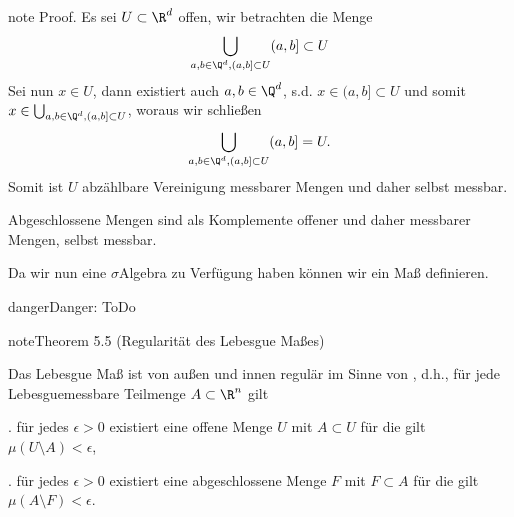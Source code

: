 \documentclass[letterpaper,10pt,english]{jupyterBook}
\begin{document}
\begin{sphinxadmonition}{note}
\sphinxAtStartPar
Proof. Es sei \(U\subset\R^d\) offen, wir betrachten die Menge
\begin{equation*}
\begin{split}\bigcup_{a,b\in \Q^d, (a,b]\subset U} (a,b]\subset U\end{split}
\end{equation*}
\sphinxAtStartPar
Sei nun \(x\in U\), dann existiert auch \(a,b\in\Q^d\), s.d. \(x\in(a,b]\subset U\) und somit \(x\in\bigcup_{a,b\in \Q^d, (a,b]\subset U}\), woraus wir schließen
\begin{equation*}
\begin{split}\bigcup_{a,b\in \Q^d, (a,b]\subset U} (a,b] = U.\end{split}
\end{equation*}
\sphinxAtStartPar
Somit ist \(U\) abzählbare Vereinigung messbarer Mengen und daher selbst messbar.

\sphinxAtStartPar
Abgeschlossene Mengen sind als Komplemente offener und daher messbarer Mengen, selbst messbar.
\end{sphinxadmonition}

\sphinxAtStartPar
Da wir nun eine \(\sigma\)\sphinxhyphen{}Algebra zu Verfügung haben können wir ein Maß definieren.

\begin{sphinxadmonition}{danger}{Danger:}
\sphinxAtStartPar
ToDo
\end{sphinxadmonition}
\label{masstheorie/masstheorie:theorem-37}
\begin{sphinxadmonition}{note}{Theorem 5.5 (Regularität des Lebesgue Maßes)}



\sphinxAtStartPar
Das Lebesgue Maß ist von außen und innen regulär im Sinne von {\hyperref[\detokenize{masstheorie/masstheorie:def:regularitaet}]{}}, d.h., für jede Lebesgue\sphinxhyphen{}messbare Teilmenge \(A \subset \R^n\) gilt

. für jedes \(\epsilon > 0\) existiert eine offene Menge \(U\) mit \(A \subset U\) für die gilt \(\mu(U \setminus A) < \epsilon\),

. für jedes \(\epsilon > 0\) existiert eine abgeschlossene Menge \(F\) mit \(F \subset A\) für die gilt \(\mu(A \setminus F) < \epsilon\).
\end{sphinxadmonition}
\end{document}

